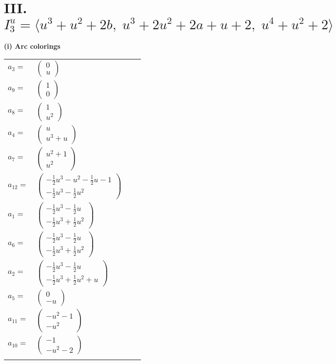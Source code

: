 \documentclass[1p]{elsarticle_modified}
\theoremstyle{definition}
\begin{document}
\centering \section*{III. $I^u_{3}= \langle u^3+u^2+2 b,\;u^3+2 u^2+2 a+u+2,\;u^4+u^2+2 \rangle$}
\flushleft \textbf{(i) Arc colorings}\\
\begin{tabular}{m{7pt} m{180pt} m{7pt} m{180pt} }
\flushright $a_{3}=$&$\begin{pmatrix}0\\u\end{pmatrix}$ \\
\flushright $a_{9}=$&$\begin{pmatrix}1\\0\end{pmatrix}$ \\
\flushright $a_{8}=$&$\begin{pmatrix}1\\u^2\end{pmatrix}$ \\
\flushright $a_{4}=$&$\begin{pmatrix}u\\u^3+u\end{pmatrix}$ \\
\flushright $a_{7}=$&$\begin{pmatrix}u^2+1\\u^2\end{pmatrix}$ \\
\flushright $a_{12}=$&$\begin{pmatrix}-\frac{1}{2} u^3- u^2-\frac{1}{2} u-1\\-\frac{1}{2} u^3-\frac{1}{2} u^2\end{pmatrix}$ \\
\flushright $a_{1}=$&$\begin{pmatrix}-\frac{1}{2} u^3-\frac{1}{2} u\\-\frac{1}{2} u^3+\frac{1}{2} u^2\end{pmatrix}$ \\
\flushright $a_{6}=$&$\begin{pmatrix}-\frac{1}{2} u^3-\frac{1}{2} u\\-\frac{1}{2} u^3+\frac{1}{2} u^2\end{pmatrix}$ \\
\flushright $a_{2}=$&$\begin{pmatrix}-\frac{1}{2} u^3-\frac{1}{2} u\\-\frac{1}{2} u^3+\frac{1}{2} u^2+u\end{pmatrix}$ \\
\flushright $a_{5}=$&$\begin{pmatrix}0\\- u\end{pmatrix}$ \\
\flushright $a_{11}=$&$\begin{pmatrix}- u^2-1\\- u^2\end{pmatrix}$ \\
\flushright $a_{10}=$&$\begin{pmatrix}-1\\- u^2-2\end{pmatrix}$\\&\end{tabular}
\end{document}
